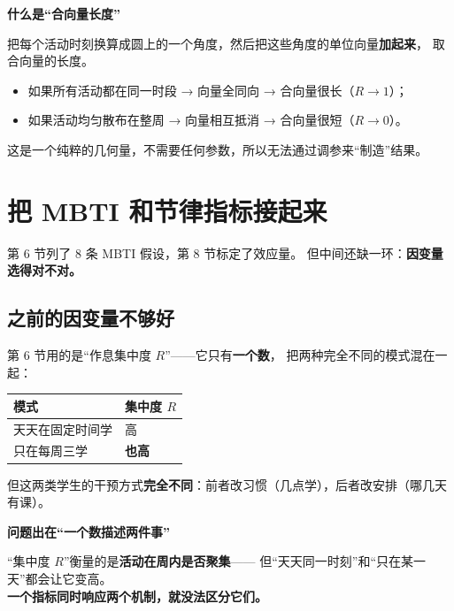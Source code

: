\documentclass[UTF8,a4paper,11pt]{ctexart}
\newenvironment{explainbox}[1]
{\begin{center}\begin{minipage}{0.94\textwidth}\colorbox{boxbg}{\parbox{0.92\textwidth}{\textbf{#1}\par\vspace{2pt}}}}
{\end{minipage}\end{center}}
\newcommand{\hl}[1]{\textcolor{blue!70!black}{\textbf{#1}}}
\begin{document}
\begin{explainbox}{什么是“合向量长度”}
把每个活动时刻换算成圆上的一个角度，然后把这些角度的单位向量\textbf{加起来}，
取合向量的长度。\\[4pt]
\begin{itemize}[leftmargin=1.4em,itemsep=1pt]
\item 如果所有活动都在同一时段 → 向量全同向 → 合向量很长（$R \to 1$）；
\item 如果活动均匀散布在整周 → 向量相互抵消 → 合向量很短（$R \to 0$）。
\end{itemize}
这是一个纯粹的几何量，不需要任何参数，所以无法通过调参来“制造”结果。
\end{explainbox}

\newpage


\section{把 MBTI 和节律指标接起来}

第 6 节列了 8 条 MBTI 假设，第 8 节标定了效应量。
但中间还缺一环：\textbf{因变量选得对不对。}

\subsection{之前的因变量不够好}

第 6 节用的是“作息集中度 $R$”——它只有\textbf{一个数}，
把两种完全不同的模式混在一起：

\begin{center}
\begin{tabular}{p{6.2cm}p{6.2cm}}
\toprule
\textbf{模式} & \textbf{集中度 $R$} \\
\midrule
天天在固定时间学 & 高 \\
只在每周三学 & \textbf{也高} \\
\bottomrule
\end{tabular}
\end{center}

但这两类学生的干预方式\textbf{完全不同}：前者改习惯（几点学），后者改安排（哪几天有课）。

\begin{explainbox}{问题出在“一个数描述两件事”}
“集中度 $R$”衡量的是\hl{活动在周内是否聚集}——
但“天天同一时刻”和“只在某一天”都会让它变高。\\
\textbf{一个指标同时响应两个机制，就没法区分它们。}
\end{explainbox}
\end{document}
